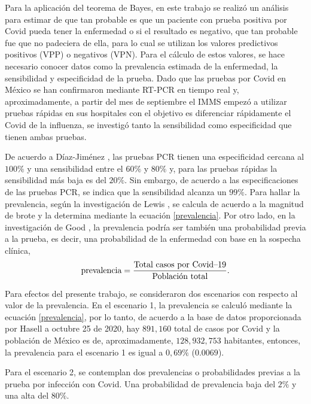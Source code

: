\documentclass{article}
\begin{document}
Para la aplicación del teorema de Bayes, en este trabajo se realizó un análisis para estimar de que tan probable es que un paciente con prueba positiva por Covid pueda tener la enfermedad o si el resultado es negativo, que tan probable fue que no padeciera de ella, para lo cual se utilizan los valores predictivos positivos (VPP) o negativos (VPN). Para el cálculo de estos valores, se hace necesario conocer datos como la prevalencia estimada de la enfermedad, la sensibilidad y especificidad de la prueba. Dado que las pruebas por Covid en México se han confirmaron mediante RT-PCR en tiempo real y, aproximadamente, a partir del mes de septiembre el IMMS empezó a utilizar pruebas rápidas en sus hospitales con el objetivo es diferenciar rápidamente el Covid de la influenza, se investigó tanto la sensibilidad como especificidad que tienen ambas pruebas.

De acuerdo a Díaz-Jiménez \cite{sensibilidad}, las pruebas PCR tienen una especificidad cercana al $100\%$ y una sensibilidad entre el $60\%$ y $80\%$ y, para las pruebas rápidas la sensibilidad más baja es del $20\%$. Sin embargo, de acuerdo a las especificaciones de las pruebas PCR, se indica que la sensibilidad alcanza un $99\%$. Para hallar la prevalencia, según la investigación de Lewis \cite{link2}, se calcula de acuerdo a la magnitud de brote y la determina mediante la ecuación \ref{prevalencia}. Por otro lado, en la investigación de Good \cite{link4}, la prevalencia podría ser también una probabilidad previa a la prueba, es decir, una probabilidad de la enfermedad con base en la sospecha clínica,
\begin{equation}
\text{prevalencia}= \frac{\text{Total casos por Covid\textendash 19}}{\text{Población total}}.
\label{prevalencia}
\end{equation}

Para efectos del presente trabajo, se consideraron dos escenarios con respecto al valor de la prevalencia. En el escenario 1, la prevalencia se calculó mediante la ecuación \ref{prevalencia}, por lo tanto, de acuerdo a la base de datos proporcionada por Hasell \cite{basededatos} a octubre 25 de 2020, hay $891,160$ total de casos por Covid y la población de México es de, aproximadamente, $128,932,753$ habitantes, entonces, la prevalencia para el escenario 1 es igual a $0,69\%$ ($0.0069$).

Para el escenario 2, se contemplan dos prevalencias o probabilidades previas a la prueba por infección con Covid. Una probabilidad de prevalencia baja del $2\%$ y una alta del $80\%$.
\end{document}
